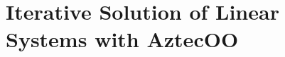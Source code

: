 % 
% 
% 
%  
%  
% 

\chapter{Iterative Solution of Linear Systems with AztecOO}
\label{chap:aztecoo}


